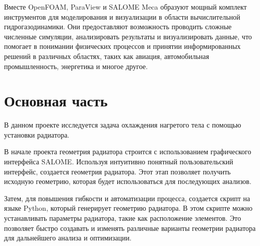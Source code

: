 \documentclass[a4paper,12pt]{article}
\theoremstyle{plain} %
\theoremstyle{definition} %
\theoremstyle{remark} %
\begin{document}
Вместе OpenFOAM, ParaView и SALOME Meca образуют мощный комплект инструментов для моделирования и визуализации в области вычислительной гидрогазодинамики. Они предоставляют возможность проводить сложные численные симуляции, анализировать результаты и визуализировать данные, что помогает в понимании физических процессов и принятии информированных решений в различных областях, таких как авиация, автомобильная промышленность, энергетика и многое другое.

\newpage
\section{Основная часть}

В данном проекте исследуется задача охлаждения нагретого тела с помощью установки радиатора.

В начале проекта геометрия радиатора строится с использованием графического интерфейса SALOME. Используя интуитивно понятный пользовательский интерфейс, создается геометрия радиатора. Этот этап позволяет получить исходную геометрию, которая будет использоваться для последующих анализов.

Затем, для повышения гибкости и автоматизации процесса, создается скрипт на языке Python, который генерирует геометрию радиатора. В этом скрипте можно устанавливать параметры радиатора, такие как расположение элементов. Это позволяет быстро создавать и изменять различные варианты геометрии радиатора для дальнейшего анализа и оптимизации.
\end{document}
